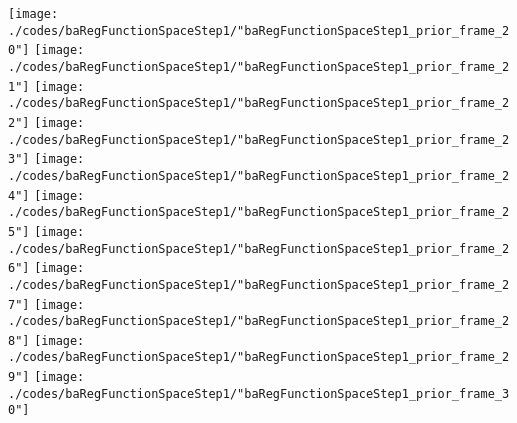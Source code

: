 \begin{frame}{\insertsection}
\begin{center}
{\begin{animateinline}{15}
				 \texttt{[image: ./codes/baRegFunctionSpaceStep1/"baRegFunctionSpaceStep1\_prior\_frame\_20"]}\newframe
				 \texttt{[image: ./codes/baRegFunctionSpaceStep1/"baRegFunctionSpaceStep1\_prior\_frame\_21"]}\newframe
				 \texttt{[image: ./codes/baRegFunctionSpaceStep1/"baRegFunctionSpaceStep1\_prior\_frame\_22"]}\newframe
				 \texttt{[image: ./codes/baRegFunctionSpaceStep1/"baRegFunctionSpaceStep1\_prior\_frame\_23"]}\newframe
				 \texttt{[image: ./codes/baRegFunctionSpaceStep1/"baRegFunctionSpaceStep1\_prior\_frame\_24"]}\newframe
				 \texttt{[image: ./codes/baRegFunctionSpaceStep1/"baRegFunctionSpaceStep1\_prior\_frame\_25"]}\newframe
				 \texttt{[image: ./codes/baRegFunctionSpaceStep1/"baRegFunctionSpaceStep1\_prior\_frame\_26"]}\newframe
				 \texttt{[image: ./codes/baRegFunctionSpaceStep1/"baRegFunctionSpaceStep1\_prior\_frame\_27"]}\newframe
				 \texttt{[image: ./codes/baRegFunctionSpaceStep1/"baRegFunctionSpaceStep1\_prior\_frame\_28"]}\newframe
				 \texttt{[image: ./codes/baRegFunctionSpaceStep1/"baRegFunctionSpaceStep1\_prior\_frame\_29"]}\newframe
				 \texttt{[image: ./codes/baRegFunctionSpaceStep1/"baRegFunctionSpaceStep1\_prior\_frame\_30"]}
			 \end{animateinline}
			}
	\end{center}
    
\end{frame}

